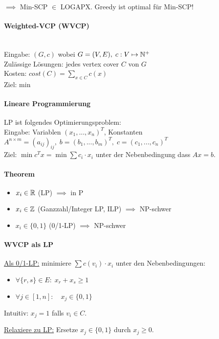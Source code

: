 $\implies$ Min-SCP $\in$ LOGAPX. Greedy ist optimal für Min-SCP!

\paragraph{Weighted-VCP (WVCP)} \mbox{} \\
Eingabe: $ (G, c)$ wobei $G=(V,E), \; c : V \mapsto \mathbb{N}^+ $ \\
Zulässige Lösungen: jedes vertex cover $C$ von $G$ \\
Kosten: $cost(C) = \sum_{x \in C} c(x)$ \\
Ziel: min

\paragraph{Lineare Programmierung}
LP ist folgendes Optimierungsproblem:
\\
Eingabe: Variablen $(x_1, ..., x_n)^T$,
Konstanten $A^{n \times m} = (a_{ij})_{ij}, \; b = (b_1, ..., b_m)^T, \; c = (c_1, ..., c_n)^T$
\\
Ziel: $\min c^T x = \min \sum c_i \cdot x_i$ unter der Nebenbedingung dass $Ax = b$.

\paragraph{Theorem}
\begin{itemize}
    \item $x_i \in \mathbb{R}$ (LP) $\implies$ in P
    \item $x_i \in \mathbb{Z}$ (Ganzzahl/Integer LP, ILP) $\implies$ NP-schwer
    \item $x_i \in \{0,1\}$ (0/1-LP) $\implies$ NP-schwer
\end{itemize}

\paragraph{WVCP als LP}
\underline{Als 0/1-LP:}
minimiere $\sum c(v_i) \cdot x_i$ \quad unter den Nebenbedingungen:
\begin{itemize}
    \item $\forall \{r,s\} \in E : \; x_r + x_s \geq 1$
    \item $\forall j \in [1,n] : \quad x_j \in \{0,1\}$
\end{itemize}
Intuitiv: $x_j = 1$ falls $v_i \in C$.

\underline{Relaxiere zu LP:}
Ersetze $x_j \in \{0,1\}$ durch $x_j \geq 0$.

